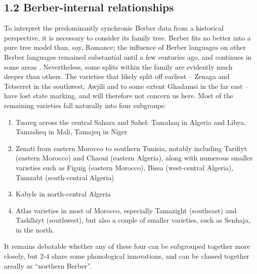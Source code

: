 \documentclass[output=paper]{langscibook}
\begin{document}
\subsection{1.2 Berber-internal relationships}
\begin{styleStandarduser}
To interpret the predominantly synchronic Berber data from a historical perspective, it is necessary to consider its family tree. Berber fits no better into a pure tree model than, say, Romance; the influence of Berber languages on other Berber languages remained substantial until a few centuries ago, and continues in some areas \citep{Souag2017}. Nevertheless, some splits within the family are evidently much deeper than others. The varieties that likely split off earliest – Zenaga and Tetserret in the southwest, Awjili and to some extent Ghadamsi in the far east – have lost state marking, and will therefore not concern us here. Most of the remaining varieties fall naturally into four subgroups:
\end{styleStandarduser}

\begin{enumerate}
\item Tuareg across the central Sahara and Sahel: Tamahaq in Algeria and Libya, Tamasheq in Mali, Tamajeq in Niger
\item 
Zenati from eastern Morocco to southern Tunisia, notably including Tarifiyt (eastern Morocco) and Chaoui (eastern Algeria), along with numerous smaller varieties such as Figuig (eastern Morocco), Bissa (west-central Algeria), Tumzabt (south-central Algeria)
\item 
Kabyle in north-central Algeria
\item 
Atlas varieties in most of Morocco, especially Tamazight (southeast) and Tashlhiyt (southwest), but also a couple of smaller varieties, such as Senhaja, in the north.
\end{enumerate}
\begin{styleStandarduser}
It remains debatable whether any of these four can be subgrouped together more closely, but 2-4 share some phonological innovations, and can be classed together areally as “northern Berber”.
\end{styleStandarduser}
\end{document}
